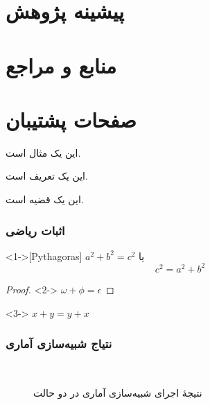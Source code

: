 \documentclass[xcolor=dvipsnames, professionalfonts, aspectratio=169, 11pt]{beamer}
\begin{document}
\section{پیشینه پژوهش}

\section{منابع و مراجع}
\begin{frame}
    \begin{latin}
        \scriptsize
        
    \end{latin}

\end{frame}

\section{صفحات پشتیبان}

\begin{frame}

    \begin{example}
    این یک مثال است.
    \end{example}

    \begin{definition}
    این یک تعریف است.
    \end{definition}

    \begin{theorem}
    این یک قضیه است.
    \end{theorem}
\end{frame}

\begin{frame}
\frametitle{اثبات ریاضی}
\begin{theorem}<1->[Pythagoras]
$ a^2 + b^2 = c^2$
یا
    \[c^2=a^2+b^2\]
\end{theorem}
\begin{proof}<2->
$\omega +\phi = \epsilon $
\end{proof}
\begin{corollary}<3->
$ x + y = y + x  $
\end{corollary}
\end{frame}

\begin{frame}[noframenumbering]
    \frametitle{نتیاج شبیه‌سازی آماری}

    \begin{figure}[htb]
        \centering
        \
        \caption{نتیجهٔ اجرای شبیه‌سازی آماری در دو حالت}
        \label{fig:ode-sais}
    \end{figure}

\end{frame}
\end{document}
